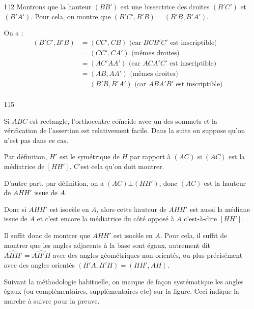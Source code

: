 \begin{Soln}{112}
Montrons que la hauteur $(BB')$ est une bissectrice des droites $(B'C')$ et $(B'A')$. Pour cela, on montre que $(B'C',B'B)=(B'B,B'A')$.

On a :
\begin{align*}
(B'C',B'B)
&= (CC',CB) \text{ (car $BCB'C'$ est inscriptible)}\\
&= (CC',CA') \text{ (mêmes droites)}\\
&= (AC'AA') \text{ (car $ACA'C'$ est inscriptible)}\\
&= (AB,AA') \text{ (mêmes droites)}\\
&= (B'B,B'A') \text{ (car $ABA'B'$ est inscriptible)}\\
\end{align*}

\end{Soln}
\begin{Soln}{115}

Si $ABC$ est rectangle, l'orthocentre coïncide avec un des sommets et la vérification de l'assertion est relativement facile. Dans la suite on suppose qu'on n'est pas dans ce cas.

Par définition, $H'$ est le symétrique de $H$ par rapport à $(AC)$ si $(AC)$ est la médiatrice de $[HH']$. C'est cela qu'on doit montrer.



D'autre part, par définition, on a $(AC) \bot (HH')$, donc $(AC)$ est la hauteur de $AHH'$ issue de $A$.

Donc si $AHH'$ est isocèle en $A$, alors cette hauteur de $AHH'$  est aussi la médiane issue de $A$ et c'est encore la médiatrice du côté opposé à $A$ c'est-à-dire $[HH']$.

Il suffit donc de montrer que $AHH'$ est isocèle en $A$. Pour cela, il suffit de montrer que les angles adjacents à la base sont égaux, autrement dit $\widehat{AHH'} = \widehat{AH'H}$ avec des angles géométriques non orientés, ou plus précisément avec des angles orientés $(H'A,H'H)=(HH',AH)$.

Suivant la méthodologie habituelle, on marque de façon systématique les angles égaux (ou complémentaires, supplémentaires etc) sur la figure. Ceci indique la marche à suivre pour la preuve.



\end{Soln}
